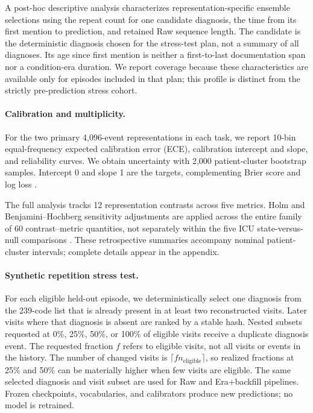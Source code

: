 \documentclass{article}
\begin{document}
A post-hoc descriptive analysis characterizes representation-specific ensemble
selections using the repeat count for one candidate diagnosis, the time from
its first mention to prediction, and retained Raw sequence length. The candidate
is the deterministic diagnosis chosen for the stress-test plan, not a summary
of all diagnoses. Its age since first mention is neither a first-to-last
documentation span nor a condition-era duration. We report coverage because
these characteristics are available only for episodes included in that plan;
this profile is distinct from the strictly pre-prediction stress cohort.

\paragraph{Calibration and multiplicity.}

For the two primary 4,096-event representations in each task, we report
10-bin equal-frequency expected calibration error (ECE), calibration intercept
and slope, and reliability curves. We obtain uncertainty with 2,000
patient-cluster bootstrap samples. Intercept 0 and slope 1 are the targets,
complementing Brier score and log loss \citep{vancalster2019calibration}.

The full analysis tracks 12 representation contrasts across five metrics.
Holm and Benjamini--Hochberg sensitivity adjustments are applied across the
entire family of 60 contrast--metric quantities, not separately within the five
ICU state-versus-null comparisons \citep{holm1979multiple,benjamini1995fdr}.
These retrospective summaries accompany nominal patient-cluster intervals;
complete details appear in the appendix.

\paragraph{Synthetic repetition stress test.}

For each eligible held-out episode, we deterministically select one diagnosis
from the 239-code list that is already present in at least two reconstructed
visits. Later visits where that diagnosis is absent are ranked by a stable
hash. Nested subsets requested at 0\%, 25\%, 50\%, or 100\% of eligible visits
receive a duplicate diagnosis event. The requested fraction $f$ refers to
eligible visits, not all visits or events in the history. The number of changed
visits is $\lceil f n_{\mathrm{eligible}}\rceil$, so realized fractions at
25\% and 50\% can be materially higher when few visits are eligible.
The same selected diagnosis and visit subset are used for Raw and Era+backfill
pipelines. Frozen checkpoints, vocabularies, and calibrators produce new
predictions; no model is retrained.
\end{document}
